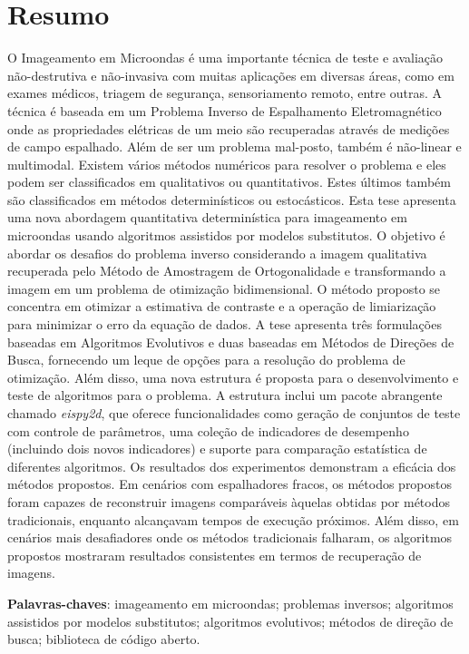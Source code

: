 \chapter*{Resumo}

	\noindent O Imageamento em Microondas é uma importante técnica de teste e avaliação não-destrutiva e não-invasiva com muitas aplicações em diversas áreas, como em exames médicos, triagem de segurança, sensoriamento remoto, entre outras. A técnica é baseada em um Problema Inverso de Espalhamento Eletromagnético onde as propriedades elétricas de um meio são recuperadas através de medições de campo espalhado. Além de ser um problema mal-posto, também é não-linear e multimodal. Existem vários métodos numéricos para resolver o problema e eles podem ser classificados em qualitativos ou quantitativos. Estes últimos também são classificados em métodos determinísticos ou estocásticos. Esta tese apresenta uma nova abordagem quantitativa determinística para imageamento em microondas usando algoritmos assistidos por modelos substitutos. O objetivo é abordar os desafios do problema inverso considerando a imagem qualitativa recuperada pelo Método de Amostragem de Ortogonalidade e transformando a imagem em um problema de otimização bidimensional. O método proposto se concentra em otimizar a estimativa de contraste e a operação de limiarização para minimizar o erro da equação de dados. A tese apresenta três formulações baseadas em Algoritmos Evolutivos e duas baseadas em Métodos de Direções de Busca, fornecendo um leque de opções para a resolução do problema de otimização. Além disso, uma nova estrutura é proposta para o desenvolvimento e teste de algoritmos para o problema. A estrutura inclui um pacote abrangente chamado \textit{eispy2d}, que oferece funcionalidades como geração de conjuntos de teste com controle de parâmetros, uma coleção de indicadores de desempenho (incluindo dois novos indicadores) e suporte para comparação estatística de diferentes algoritmos. Os resultados dos experimentos demonstram a eficácia dos métodos propostos. Em cenários com espalhadores fracos, os métodos propostos foram capazes de reconstruir imagens comparáveis àquelas obtidas por métodos tradicionais, enquanto alcançavam tempos de execução próximos. Além disso, em cenários mais desafiadores onde os métodos tradicionais falharam, os algoritmos propostos mostraram resultados consistentes em termos de recuperação de imagens.

	\vspace{5mm}
	
	\noindent\textbf{Palavras-chaves}: imageamento em microondas; problemas inversos; algoritmos assistidos por modelos substitutos; algoritmos evolutivos; métodos de direção de busca; biblioteca de código aberto.
	
	\thispagestyle{empty}